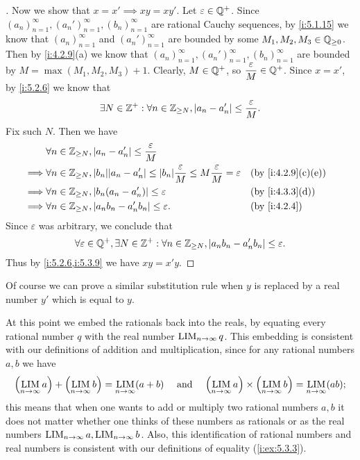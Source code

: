 \begin{proof}[]
  Now we show that \(x = x' \implies xy = xy'\).
  Let \(\varepsilon \in \mathbb{Q}^+\).
  Since \((a_n)_{n = 1}^\infty, (a_n')_{n = 1}^\infty, (b_n)_{n = 1}^\infty\) are rational Cauchy sequences, by \cref{i:5.1.15} we know that \((a_n)_{n = 1}^\infty\) and \((a_n')_{n = 1}^\infty\) are bounded by some \(M_1, M_2, M_3 \in \mathbb{Q}_{\geq 0}\).
  Then by \cref{i:4.2.9}(a) we know that \((a_n)_{n = 1}^\infty, (a_n')_{n = 1}^\infty, (b_n)_{n = 1}^\infty\) are bounded by \(M = \max(M_1, M_2, M_3) + 1\).
  Clearly, \(M \in \mathbb{Q}^+\), so \(\dfrac{\varepsilon}{M} \in \mathbb{Q}^+\).
  Since \(x = x'\), by \cref{i:5.2.6} we know that
  \[
    \exists N \in \mathbb{Z}^+ : \forall n \in \mathbb{Z}_{\geq N}, \left\lvert a_n - a_n'\right\rvert \leq \dfrac{\varepsilon}{M}.
  \]
  Fix such \(N\).
  Then we have
  \begin{align*}
             & \forall n \in \Z_{\geq N}, \abs{a_n - a_n'} \leq \dfrac{\varepsilon}{M}                                                                                        \\
    \implies & \forall n \in \Z_{\geq N}, \abs{b_n} \abs{a_n - a_n'} \leq \abs{b_n} \dfrac{\varepsilon}{M} \leq M \dfrac{\varepsilon}{M} = \varepsilon &  & \by{i:4.2.9}[c,e] \\
    \implies & \forall n \in \Z_{\geq N}, \abs{b_n (a_n - a_n')} \leq \varepsilon                                                                      &  & \by{i:4.3.3}[d]   \\
    \implies & \forall n \in \Z_{\geq N}, \abs{a_n b_n - a_n' b_n} \leq \varepsilon.                                                                   &  & \by{i:4.2.4}
  \end{align*}
  Since \(\varepsilon\) was arbitrary, we conclude that
  \[
    \forall \varepsilon \in \mathbb{Q}^+, \exists N \in \mathbb{Z}^+ : \forall n \in \mathbb{Z}_{\geq N}, \left\lvert a_n b_n - a_n' b_n\right\rvert \leq \varepsilon.
  \]
  Thus by \cref{i:5.2.6,i:5.3.9} we have \(xy = x'y\).
\end{proof}

\begin{note}
  Of course we can prove a similar substitution rule when \(y\) is replaced by a real number \(y'\) which is equal to \(y\).
\end{note}

\begin{ac}\label{i:ac:5.3.1}
  At this point we embed the rationals back into the reals, by equating every rational number \(q\) with the real number \(\operatorname*{LIM}_{n \to \infty} q\).
  This embedding is consistent with our definitions of addition and multiplication, since for any rational numbers \(a, b\) we have
  \[
    \pa{\LIM_{n \to \infty} a} + \pa{\LIM_{n \to \infty} b} = \LIM_{n \to \infty} (a + b) \quad \text{ and } \quad \pa{\LIM_{n \to \infty} a} \times \pa{\LIM_{n \to \infty} b} = \LIM_{n \to \infty} (ab);
  \]
  this means that when one wants to add or multiply two rational numbers \(a, b\) it does not matter whether one thinks of these numbers as rationals or as the real numbers \(\operatorname*{LIM}_{n \to \infty} a, \operatorname*{LIM}_{n \to \infty} b\).
  Also, this identification of rational numbers and real numbers is consistent with our definitions of equality (\cref{i:ex:5.3.3}).
\end{ac}

